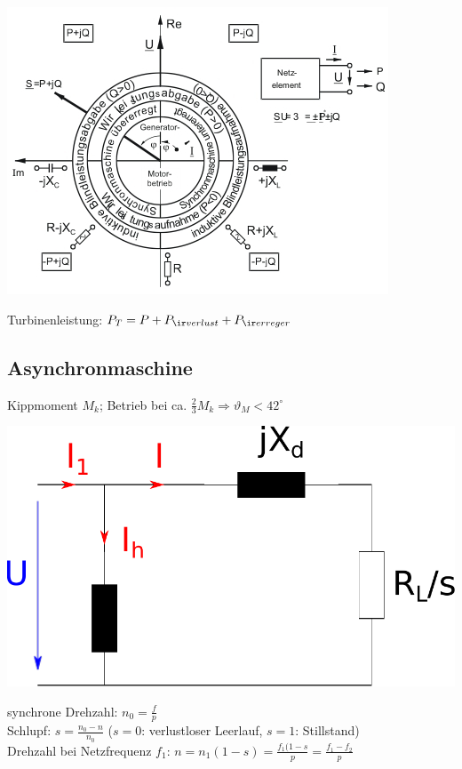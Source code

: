 \documentclass[european]{latex4ei_sheet}
\begin{document}
		\begin{center}
		\includegraphics[scale=.6]{./img/synchronmaschine_betriebsbereiche.jpg}
		\end{center}
		
		Turbinenleistung: $P_T = P + P_{\ir verlust} + P_ {\ir erreger}$		
		
		\subsection{Asynchronmaschine}
		
				Kippmoment $M_k$; Betrieb bei ca. $\frac{2}{3} M_k \Rightarrow \vartheta_M < 42^\circ$\\

		
		\begin{center}
		\includegraphics[scale=.2]{./img/ersatzschaltbild_asynchronmaschine.pdf}
		\end{center}
		
		 synchrone Drehzahl: $n_0 = \frac{f}{p}$ \\
		 Schlupf: $s = \frac{n_0 - n}{n_0}$ ($s=0$: verlustloser Leerlauf, $s=1$: Stillstand) \\
		 Drehzahl bei Netzfrequenz $f_1$: $n=n_1(1-s)=\frac{f_1(1-s}{p} = \frac{f_1-f_2}{p}$
		 		 
\end{document}
